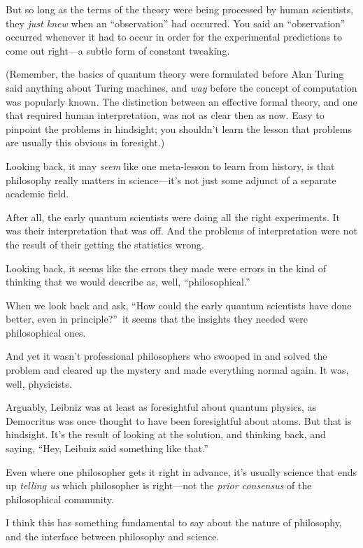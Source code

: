 {
 But so long as the terms of the theory were being processed by
human scientists, they \textit{just knew} when an
``observation'' had occurred. You
said an ``observation'' occurred
whenever it had to occur in order for the experimental predictions to
come out right---a subtle form of constant tweaking.}

{
 (Remember, the basics of quantum theory were formulated before
Alan Turing said anything about Turing machines, and \textit{way}
before the concept of computation was popularly known. The distinction
between an effective formal theory, and one that required human
interpretation, was not as clear then as now. Easy to pinpoint the
problems in hindsight; you shouldn't learn the lesson
that problems are usually this obvious in foresight.)}

{
 Looking back, it may \textit{seem} like one meta-lesson to learn
from history, is that philosophy really matters in
science---it's not just some adjunct of a separate
academic field.}

{
 After all, the early quantum scientists were doing all the right
experiments. It was their interpretation that was off. And the problems
of interpretation were not the result of their getting the statistics
wrong.}

{
 Looking back, it seems like the errors they made were errors in
the kind of thinking that we would describe as, well,
``philosophical.''}

{
 When we look back and ask, ``How could the early
quantum scientists have done better, even in
principle?''~it seems that the insights they needed
were philosophical ones.}

{
 And yet it wasn't professional philosophers who
swooped in and solved the problem and cleared up the mystery and made
everything normal again. It was, well, physicists.}

{
 Arguably, Leibniz was at least as foresightful about quantum
physics, as Democritus was once thought to have been foresightful about
atoms. But that is hindsight. It's the result of
looking at the solution, and thinking back, and saying,
``Hey, Leibniz said something like
that.''}

{
 Even where one philosopher gets it right in advance,
it's usually science that ends up \textit{telling us}
which philosopher is right---not the \textit{prior consensus} of the
philosophical community.}

{
 I think this has something fundamental to say about the nature of
philosophy, and the interface between philosophy and science.}

